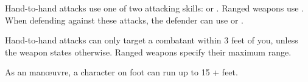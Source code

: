 
Hand-to-hand attacks use one of two attacking skills:  or . Ranged weapons use . When defending against these attacks, the defender can use  or .

Hand-to-hand attacks can only target a combatant within 3 feet of you, unless the weapon states otherwise. Ranged weapons specify their maximum range.

As an  man\oe{}uvre, a character on foot can run up to 15 +  feet.
